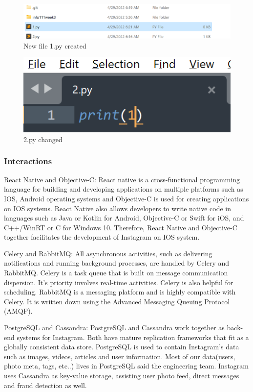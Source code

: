 \documentclass[a4paper, 11pt]{report}
\begin{document}
\begin{figure}[!h]
\centering
\includegraphics[width=0.45\columnwidth]{Picture4.png}
\caption{New file 1.py created}
\label{fig}
\end{figure}

\begin{figure}[!h]
\centering
\includegraphics[width=0.45\columnwidth]{Picture5.png}
\caption{2.py changed}
\label{fig}
\end{figure}

\subsubsection{ Interactions}
React Native and Objective-C: React native is a cross-functional programming language for building and developing applications on multiple platforms such as IOS, Android operating 
systems and Objective-C is used for creating applications on IOS systems. React Native also allows developers to write native code in languages such as Java or Kotlin for Android, Objective-C or Swift for iOS, and C++/WinRT or C for Windows 10. Therefore, React Native and Objective-C together facilitates the development of Instagram on IOS system.

 Celery and RabbitMQ: All asynchronous activities, such as delivering notifications and running background processes, are handled by Celery and RabbitMQ. Celery is a task queue that is built on message communication dispersion. It's priority involves real-time activities. Celery is also helpful for scheduling. RabbitMQ is a messaging platform and is highly compatible with Celery. It is written down using the Advanced Messaging Queuing Protocol (AMQP).

PostgreSQL and Cassandra: PostgreSQL and Cassandra work together as back-end systems for Instagram. Both have mature replication frameworks that fit as a globally consistent data store. PostgreSQL is used to contain Instagram's data such as images, videos, articles and user information. Most of our data(users, photo meta, tags, etc..) lives in PostgreSQL said the engineering team. Instagram uses Cassandra as key-value storage, assisting user photo feed, direct messages and fraud detection as well.
\end{document}

